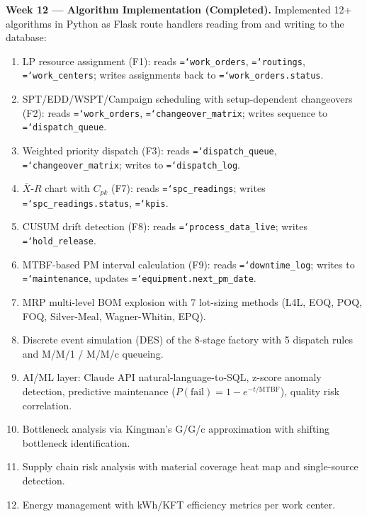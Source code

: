 \documentclass[11pt]{article}
\newcommand{\tfield}[1]{\texttt{\hyphenchar\font=`\-\relax #1}}
\begin{document}
\textbf{Week 12 --- Algorithm Implementation (Completed).}
Implemented 12+ algorithms in Python as Flask route handlers reading from and writing to the database:

\begin{enumerate}[leftmargin=2em, itemsep=1pt]
\item LP resource assignment (F1): reads \tfield{work\_orders}, \tfield{routings}, \tfield{work\_centers}; writes assignments back to \tfield{work\_orders.status}.
\item SPT/EDD/WSPT/Campaign scheduling with setup-dependent changeovers (F2): reads \tfield{work\_orders}, \tfield{changeover\_matrix}; writes sequence to \tfield{dispatch\_queue}.
\item Weighted priority dispatch (F3): reads \tfield{dispatch\_queue}, \tfield{changeover\_matrix}; writes to \tfield{dispatch\_log}.
\item $\bar{X}$-$R$ chart with $C_{pk}$ (F7): reads \tfield{spc\_readings}; writes \tfield{spc\_readings.status}, \tfield{kpis}.
\item CUSUM drift detection (F8): reads \tfield{process\_data\_live}; writes \tfield{hold\_release}.
\item MTBF-based PM interval calculation (F9): reads \tfield{downtime\_log}; writes to \tfield{maintenance}, updates \tfield{equipment.next\_pm\_date}.
\item MRP multi-level BOM explosion with 7 lot-sizing methods (L4L, EOQ, POQ, FOQ, Silver-Meal, Wagner-Whitin, EPQ).
\item Discrete event simulation (DES) of the 8-stage factory with 5 dispatch rules and M/M/1 / M/M/c queueing.
\item AI/ML layer: Claude API natural-language-to-SQL, z-score anomaly detection, predictive maintenance ($P(\text{fail}) = 1 - e^{-t/\text{MTBF}}$), quality risk correlation.
\item Bottleneck analysis via Kingman's G/G/c approximation with shifting bottleneck identification.
\item Supply chain risk analysis with material coverage heat map and single-source detection.
\item Energy management with kWh/KFT efficiency metrics per work center.
\end{enumerate}
\end{document}
